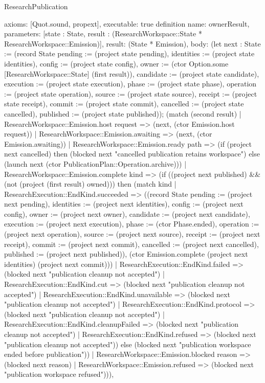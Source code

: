 \begin{lexlean}{ResearchPublication}
\begin{semanticmodule}
{ axioms: [Quot.sound, propext],
 executable: true
}
definition{
 name: ownerResult,
 parameters: [state : State, result : (ResearchWorkspace::State * ResearchWorkspace::Emission)],
 result: (State * Emission),
 body: (let next : State := (record State {pending := (project state pending), identities := (project state identities), config := (project state config), owner := (ctor Option.some [ResearchWorkspace::State] (first result)), candidate := (project state candidate), execution := (project state execution), phase := (project state phase), operation := (project state operation), source := (project state source), receipt := (project state receipt), commit := (project state commit), cancelled := (project state cancelled), published := (project state published)}); (match (second result) | ResearchWorkspace::Emission.host request => (next, (ctor Emission.host request)) | ResearchWorkspace::Emission.awaiting => (next, (ctor Emission.awaiting)) | ResearchWorkspace::Emission.ready path => (if (project next cancelled) then (blocked next "cancelled publication retains workspace") else (launch next (ctor PublicationPlan::Operation.archive))) | ResearchWorkspace::Emission.complete kind => (if ((project next published) && (not (project (first result) owned))) then (match kind | ResearchExecution::EndKind.succeeded => ((record State {pending := (project next pending), identities := (project next identities), config := (project next config), owner := (project next owner), candidate := (project next candidate), execution := (project next execution), phase := (ctor Phase.ended), operation := (project next operation), source := (project next source), receipt := (project next receipt), commit := (project next commit), cancelled := (project next cancelled), published := (project next published)}), (ctor Emission.complete (project next identities) (project next commit))) | ResearchExecution::EndKind.failed => (blocked next "publication cleanup not accepted") | ResearchExecution::EndKind.cut => (blocked next "publication cleanup not accepted") | ResearchExecution::EndKind.unavailable => (blocked next "publication cleanup not accepted") | ResearchExecution::EndKind.protocol => (blocked next "publication cleanup not accepted") | ResearchExecution::EndKind.cleanupFailed => (blocked next "publication cleanup not accepted") | ResearchExecution::EndKind.refused => (blocked next "publication cleanup not accepted")) else (blocked next "publication workspace ended before publication")) | ResearchWorkspace::Emission.blocked reason => (blocked next reason) | ResearchWorkspace::Emission.refused => (blocked next "publication workspace refused"))),
}
\end{semanticmodule}
\end{lexlean}
